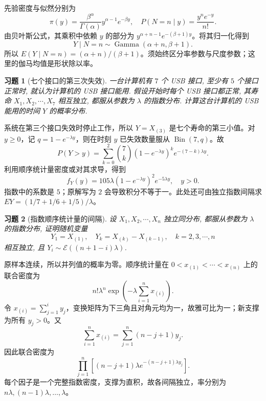 \documentclass[12pt,fontset=fandol]{ctexart}
\newtheorem{exercise}{习题}[section]
\begin{document}
\begin{solve}\label{a:A6.15}先验密度与似然分别为\[\pi(y)=\frac{\beta^\alpha}{\Gamma(\alpha)}y^{\alpha-1}e^{-\beta y},\quad P(N=n\mid y)=\frac{y^ne^{-y}}{n!}.\]由贝叶斯公式，其乘积中依赖 $y$ 的部分为 $y^{\alpha+n-1}e^{-(\beta+1)y}$。将其归一化得到\[Y\mid N=n\sim\operatorname{Gamma}(\alpha+n,\beta+1).\]所以 $E(Y\mid N=n)=(\alpha+n)/(\beta+1)$。须始终区分率参数与尺度参数；这里的伽马均值是形状除以率。\end{solve}

\begin{exercise}[七个接口的第三次失效]\label{q:A6.17}
一台计算机有 $7$ 个 USB 接口, 至少有 $5$ 个接口正常时, 就认为计算机的 USB 接口能用. 假设开始时每个 USB 接口都正常, 其寿命 $X_1,X_2,\cdots,X_7$ 相互独立, 都服从参数为 $\lambda$ 的指数分布. 计算这台计算机的 USB 能用的时间 $Y$ 的概率分布.\par{}
\end{exercise}

\begin{solve}\label{a:A6.17}系统在第三个接口失效时停止工作，所以 $Y=X_{(3)}$ 是七个寿命的第三小值。对 $y\ge0$，记 $q=1-e^{-\lambda y}$，则在时刻 $y$ 已失效数量服从 $\operatorname{Bin}(7,q)$。故\[P(Y>y)=\sum_{k=0}^{2}\binom7k(1-e^{-\lambda y})^k e^{-(7-k)\lambda y}.\]利用顺序统计量密度或对其求导，得到\[f_Y(y)=105\lambda(1-e^{-\lambda y})^2e^{-5\lambda y},\quad y>0.\]指数中的系数是 $5$；原解写为 $2$ 会导致积分不等于一。此处还可由独立指数间隔求 $EY=(1/7+1/6+1/5)/\lambda$。\end{solve}

\begin{exercise}[指数顺序统计量的间隔]\label{q:A6.20}
设 $X_1,X_2,\cdots,X_n$ 独立同分布, 都服从参数为 $\lambda$ 的指数分布, 证明随机变量
    \[Y_1=X_{(1)},\quad Y_k=X_{(k)}-X_{(k-1)},\quad k=2,3,\cdots,n\]
    相互独立, 且 $Y_i\sim\mathcal{E}((n+1-i)\lambda)$.\par{}
\end{exercise}

\begin{solve}\label{a:A6.20}原样本连续，所以并列值的概率为零。顺序统计量在 $0<x_{(1)}<\cdots<x_{(n)}$ 上的联合密度为\[n!\lambda^n\exp\left(-\lambda\sum_{i=1}^nx_{(i)}\right).\]令 $x_{(i)}=\sum_{j=1}^iy_j$，变换矩阵为下三角且对角元均为一，故雅可比为一；新支撑为所有 $y_j>0$。又\[\sum_{i=1}^nx_{(i)}=\sum_{j=1}^n(n-j+1)y_j.\]因此联合密度为\[\prod_{j=1}^n\left[(n-j+1)\lambda e^{-(n-j+1)\lambda y_j}\right].\]每个因子是一个完整指数密度，支撑为直积，故各间隔独立，率分别为 $n\lambda,(n-1)\lambda,\ldots,\lambda$。\end{solve}
\end{document}
